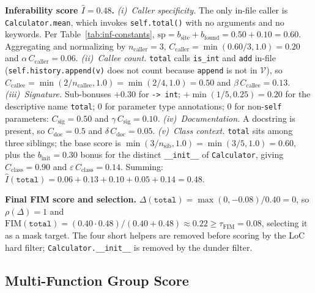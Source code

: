 \textbf{Inferability score $\hat{I}=0.48$.}
\emph{(i)~Caller specificity.} The only in-file caller is
\texttt{Calculator.mean}, which invokes \texttt{self.total()} with no
arguments and no keywords. Per
Table~\ref{tab:inf-constants},
$\mathrm{sp}=b_{\mathrm{site}}+b_{\mathrm{found}}=0.50+0.10=0.60$.
Aggregating and normalizing by $n_{\mathrm{caller}}=3$,
$C_{\mathrm{caller}}=\min(0.60/3,1.0)=0.20$ and
$\alpha\,C_{\mathrm{caller}}=0.06$.
\emph{(ii)~Callee count.} \texttt{total} calls \texttt{is\_int} and
\texttt{add} in-file (\texttt{self.history.append(v)} does not count
because \texttt{append} is not in $\mathcal{V}$), so
$C_{\mathrm{callee}}=\min(2/n_{\mathrm{callee}},1.0)=\min(2/4,1.0)=0.50$
and $\beta\,C_{\mathrm{callee}}=0.13$.
\emph{(iii)~Signature.} Sub-bonuses $+0.30$ for \texttt{-> int};
$+\min(1/5,0.25)=0.20$ for the descriptive name \texttt{total};
$0$ for parameter type annotations; $0$ for non-\texttt{self} parameters:
$C_{\mathrm{sig}}=0.50$ and $\gamma\,C_{\mathrm{sig}}=0.10$.
\emph{(iv)~Documentation.} A docstring is present, so
$C_{\mathrm{doc}}=0.5$ and $\delta\,C_{\mathrm{doc}}=0.05$.
\emph{(v)~Class context.} \texttt{total} sits among three siblings; the
base score is $\min(3/n_{\mathrm{sib}},1.0)=\min(3/5,1.0)=0.60$, plus the
$b_{\mathrm{init}}=0.30$ bonus for the distinct \texttt{\_\_init\_\_} of
\texttt{Calculator}, giving $C_{\mathrm{class}}=0.90$ and
$\varepsilon\,C_{\mathrm{class}}=0.14$.
Summing: $\hat{I}(\texttt{total})=0.06+0.13+0.10+0.05+0.14=0.48$.

\textbf{Final FIM score and selection.}
$\Delta(\texttt{total})=\max(0,-0.08)/0.40=0$, so
$\rho(\Delta)=1$ and
$\mathrm{FIM}(\texttt{total})=(0.40\!\cdot\!0.48)/(0.40\!+\!0.48)\approx 0.22 \geq \tau_{\mathrm{FIM}}=0.08$,
selecting it as a mask target. The four short helpers are removed before
scoring by the LoC hard filter; \texttt{Calculator.\_\_init\_\_} is
removed by the dunder filter.

\subsection{Multi-Function Group Score}
\label{app:algo:groups}

